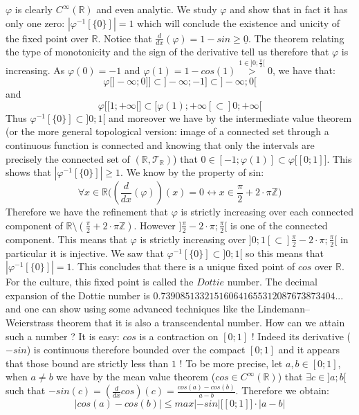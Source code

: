 \documentclass[11pt, a4paper, oneside]{article}
\theoremstyle{remark}
\theoremstyle{lemma}
\begin{document}
$\varphi$ is clearly $C^{\infty}(\mathbb{R})$ and even analytic. We study $\varphi$ and show that in fact it has only one zero: $|\varphi^{-1}[\{0\}]|=1$ which will conclude the existence and unicity of the fixed point over $\mathbb{R}$. Notice that $\frac{d}{dx}(\varphi)=1-sin\geq \underline{0}$. The theorem relating the type of monotonicity and the sign of the derivative tell us therefore that $\varphi$ is increasing. As $\varphi(0)=-1$ and $\varphi(1)=1-cos(1)\overset{1\in]0;\frac{\pi}{2}[}{>}0$, we have that:
$$\varphi\big[]-\infty;0]\big]\subset]-\infty;-1]\subset]-\infty;0[$$ and $$\varphi\big[[1;+\infty[\big]\subset[\varphi(1);+\infty[\subset]0;+\infty[$$
Thus $\varphi^{-1}[\{0\}]\subset]0;1[$
and moreover we have by the intermediate value theorem (or the more general topological version: image of a connected set through a continuous function is connected and knowing that only the intervals are precisely the connected set of $(\mathbb{R},\mathcal{T}_{\mathbb{R}})$) that $0\in[-1;\varphi(1)]\subset\varphi\big[[0;1]\big]$. This shows that $|\varphi^{-1}[\{0\}]|\geq 1$. We know by the property of sin:
$$\forall x\in\mathbb{R}\big((\frac{d}{dx}(\varphi))(x)=0\leftrightarrow x\in\frac{\pi}{2}+2\cdot\pi\mathbb{Z}\big)$$
Therefore we have the refinement that $\varphi$ is strictly increasing over each connected component of $\mathbb{R}\setminus(\frac{\pi}{2}+2\cdot\pi\mathbb{Z})$. However $]\frac{\pi}{2}-2\cdot\pi;\frac{\pi}{2}[$ is one of the connected component. This means that $\varphi$ is strictly increasing over $]0;1[\subset]\frac{\pi}{2}-2\cdot\pi;\frac{\pi}{2}[$ in particular it is injective. We saw that $\varphi^{-1}[\{0\}]\subset]0;1[$ so this means that $|\varphi^{-1}[\{0\}]|=1$. This concludes that there is a unique fixed point of $cos$ over $\mathbb{R}$. For the culture, this fixed point is called the $\textit{Dottie}$ number.
The decimal expansion of the Dottie number is
$0.739085133215160641655312087673873404...$
and one can show using some advanced techniques like the Lindemann–Weierstrass theorem that it is also a transcendental number. How can we attain such a number ? It is easy: $cos$ is a contraction on $[0;1]$ ! Indeed its derivative ($-sin$) is continuous therefore bounded over the compact $[0;1]$ and it appears that those bound are strictly less than $1$ ! To be more precise, let $a,b\in[0;1]$, when $a\neq b$ we have by the mean value theorem ($cos\in C^{\infty}(\mathbb{R})$) that $\exists c\in]a;b[$ such that $-sin(c)=(\frac{d}{dx}cos)(c)=\frac{cos(a)-cos(b)}{a-b}$. Therefore we obtain:
$$|cos(a)-cos(b)|\leq max|-sin|\big[[0;1]\big]\cdot|a-b|$$
\end{document}
